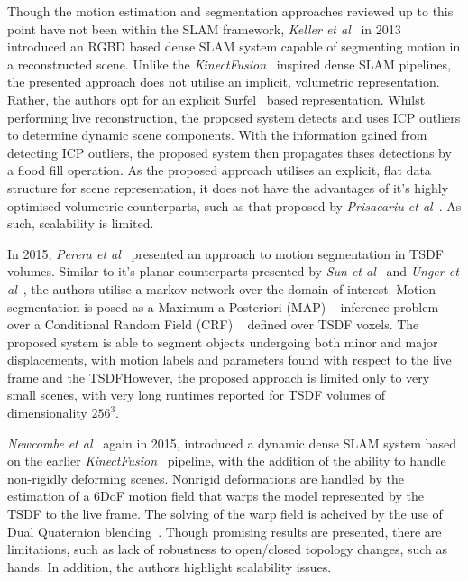 Though the motion estimation and segmentation approaches reviewed up to this point have not 
been within the SLAM framework, \textit{Keller et al}~\cite{Keller2013} in 2013 introduced an 
RGBD based dense SLAM system capable of segmenting motion in a reconstructed scene. Unlike the 
\textit{KinectFusion}~\cite{Newcombe2011} inspired dense SLAM pipelines, the presented approach 
does not utilise an implicit, volumetric representation. Rather, the authors opt for an explicit 
Surfel~\cite{Pfister2000} based representation. Whilst performing live reconstruction, the proposed 
system detects and uses ICP outliers to determine dynamic scene components. With the information gained 
from detecting ICP outliers, the proposed system then propagates thses detections by a flood fill operation. 
As the proposed approach utilises an explicit, flat data structure for scene representation, it does not 
have the advantages of it's highly optimised volumetric counterparts, such as that proposed by 
\textit{Prisacariu et al}~\cite{Prisacariu2011}. As such, scalability is limited.

In 2015, \textit{Perera et al}~\cite{Perera2015} presented an approach to motion segmentation in 
TSDF volumes. Similar to it's planar counterparts presented by \textit{Sun et al}~\cite{Sun2012} 
and \textit{Unger et al}~\cite{Unger2012}, the authors utilise a markov network over the domain 
of interest. Motion segmentation is posed as a Maximum a Posteriori (MAP) 
~\cite{BishopPRML, Murphy2012ML} inference problem over a Conditional Random Field (CRF) 
~\cite{Krahenbuhl2011} defined over TSDF voxels. The proposed system is able to segment objects 
undergoing both minor and major displacements, with motion labels and parameters found with 
respect to the live frame and the TSDF\@ However, the proposed approach is limited only to very 
small scenes, with very long runtimes reported for TSDF volumes of dimensionality \(256^{3}\).

\textit{Newcombe et al}~\cite{Newcombe2015} again in 2015, introduced a dynamic dense SLAM 
system based on the earlier \textit{KinectFusion}~\cite{Newcombe2015} pipeline, with the addition 
of the ability to handle non-rigidly deforming scenes. Nonrigid deformations are handled by the 
estimation of a 6DoF motion field that warps the model represented by the TSDF to the live frame. The 
solving of the warp field is acheived by the use of Dual Quaternion blending~\cite{Kavan2006}. 
Though promising results are presented, there are limitations, such as lack of robustness to 
open/closed topology changes, such as hands. In addition, the authors highlight scalability issues.

